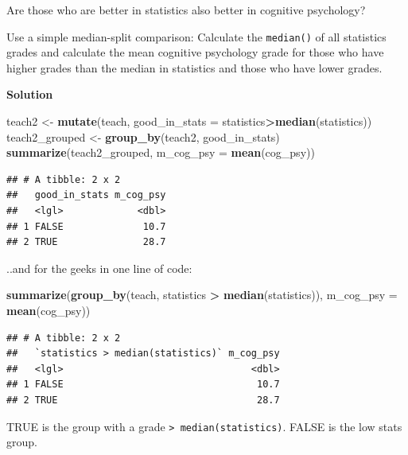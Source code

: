 \documentclass[
]{scrartcl}
\makeatletter
\newenvironment{Shaded}{\begin{snugshade}}{\end{snugshade}}
\newcommand{\DataTypeTok}[1]{\textcolor[rgb]{0.13,0.29,0.53}{#1}}
\newcommand{\KeywordTok}[1]{\textcolor[rgb]{0.13,0.29,0.53}{\textbf{#1}}}
\newcommand{\NormalTok}[1]{#1}
\newcommand{\OperatorTok}[1]{\textcolor[rgb]{0.81,0.36,0.00}{\textbf{#1}}}
\newcommand{\StringTok}[1]{\textcolor[rgb]{0.31,0.60,0.02}{#1}}
\newenvironment{kframe}{%
\medskip{}
\setlength{\fboxsep}{.8em}
 \def\at@end@of@kframe{}%
 \ifinner\ifhmode%
  \def\at@end@of@kframe{\end{minipage}}%
  \begin{minipage}{\columnwidth}%
 \fi\fi%
 \def\FrameCommand##1{\hskip\@totalleftmargin \hskip-\fboxsep
 \colorbox{shadecolor}{##1}\hskip-\fboxsep
     \hskip-\linewidth \hskip-\@totalleftmargin \hskip\columnwidth}%
 \MakeFramed {\advance\hsize-\width
   \@totalleftmargin\z@ \linewidth\hsize
   \@setminipage}}%
 {\par\unskip\endMakeFramed%
 \at@end@of@kframe}
\newenvironment{rmdblock}[1]
  {
  \begin{itemize}
  \renewcommand{\labelitemi}{
    \raisebox{-.7\height}[0pt][0pt]{
      {\setkeys{Gin}{width=3em,keepaspectratio}\texttt{[image: images/\#1]}}
    }
  }
  \setlength{\fboxsep}{1em}
  \begin{kframe}
  \item
  }
  {
  \end{kframe}
  \end{itemize}
  }
\newenvironment{myexercise}
    {\begin{rmdblock}{exercise_green}}
    {\end{rmdblock}}
\newenvironment{webexsolution}[1]
    {\par\tiny\textbf{#1}}
    {\par}
\newcommand{\webexhide}[1]{\begin{webexsolution}{#1}}
\newcommand{\webexunhide}{\end{webexsolution}}
\makeatother
\begin{document}
\webexunhide

\begin{myexercise}
Are those who are better in statistics also better in cognitive
psychology?

Use a simple median-split comparison: Calculate the \texttt{median()} of
all statistics grades and calculate the mean cognitive psychology grade
for those who have higher grades than the median in statistics and those
who have lower grades.
\end{myexercise}
\webexhide{Solution}

\begin{Shaded}
\begin{Highlighting}[]
\NormalTok{teach2 \textless{}{-}}\StringTok{ }\KeywordTok{mutate}\NormalTok{(teach, }\DataTypeTok{good\_in\_stats =}\NormalTok{ statistics}\OperatorTok{\textgreater{}}\KeywordTok{median}\NormalTok{(statistics))}
\NormalTok{teach2\_grouped \textless{}{-}}\StringTok{ }\KeywordTok{group\_by}\NormalTok{(teach2, good\_in\_stats)}
\KeywordTok{summarize}\NormalTok{(teach2\_grouped, }\DataTypeTok{m\_cog\_psy =} \KeywordTok{mean}\NormalTok{(cog\_psy))}
\end{Highlighting}
\end{Shaded}

\begin{verbatim}
## # A tibble: 2 x 2
##   good_in_stats m_cog_psy
##   <lgl>             <dbl>
## 1 FALSE              10.7
## 2 TRUE               28.7
\end{verbatim}

..and for the geeks in one line of code:

\begin{Shaded}
\begin{Highlighting}[]
\KeywordTok{summarize}\NormalTok{(}\KeywordTok{group\_by}\NormalTok{(teach, statistics }\OperatorTok{\textgreater{}}\StringTok{ }\KeywordTok{median}\NormalTok{(statistics)), }
                                \DataTypeTok{m\_cog\_psy =} \KeywordTok{mean}\NormalTok{(cog\_psy))}
\end{Highlighting}
\end{Shaded}

\begin{verbatim}
## # A tibble: 2 x 2
##   `statistics > median(statistics)` m_cog_psy
##   <lgl>                                 <dbl>
## 1 FALSE                                  10.7
## 2 TRUE                                   28.7
\end{verbatim}

TRUE is the group with a grade \texttt{\textgreater{}\ median(statistics)}. FALSE is the low stats group.
\webexunhide
\end{document}
